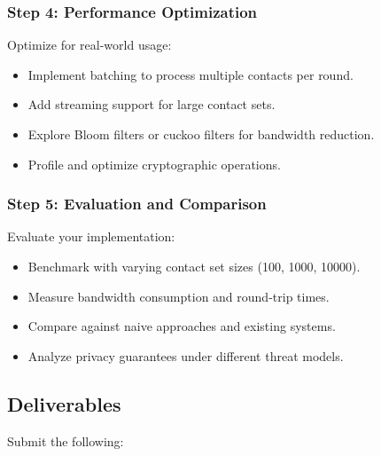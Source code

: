 \documentclass[10pt,a4paper,american]{exam}
\begin{document}
\subsubsection*{Step 4: Performance Optimization}
Optimize for real-world usage:
\begin{itemize}
	\item Implement batching to process multiple contacts per round.
	\item Add streaming support for large contact sets.
	\item Explore Bloom filters or cuckoo filters for bandwidth reduction.
	\item Profile and optimize cryptographic operations.
\end{itemize}

\subsubsection*{Step 5: Evaluation and Comparison}
Evaluate your implementation:
\begin{itemize}
	\item Benchmark with varying contact set sizes (100, 1000, 10000).
	\item Measure bandwidth consumption and round-trip times.
	\item Compare against naive approaches and existing systems.
	\item Analyze privacy guarantees under different threat models.
\end{itemize}

\subsection*{Deliverables}
Submit the following:
\end{document}
